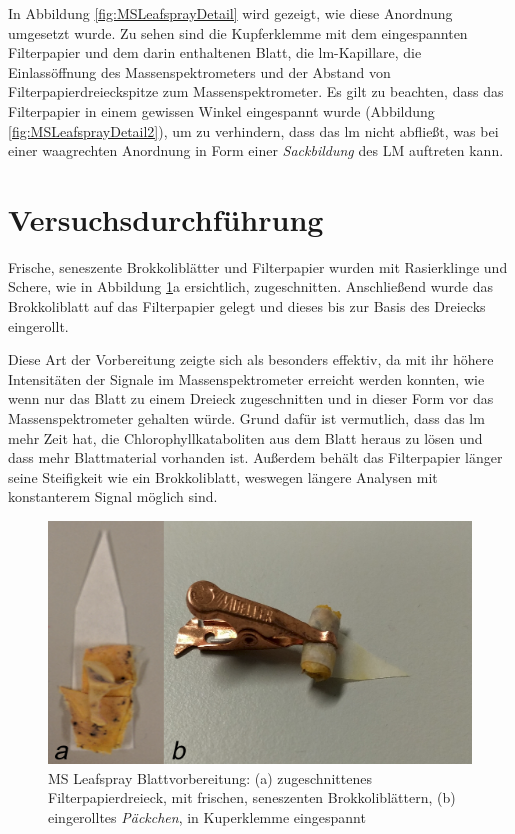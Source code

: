 In Abbildung \ref{fig:MSLeafsprayDetail} wird gezeigt, wie diese Anordnung umgesetzt wurde. Zu sehen sind die Kupferklemme mit dem eingespannten Filterpapier und dem darin enthaltenen Blatt, die \gls{lm}-Kapillare, die Einlassöffnung des Massenspektrometers und der Abstand von Filterpapierdreieckspitze zum Massenspektrometer. Es gilt zu beachten, dass das Filterpapier in einem gewissen Winkel eingespannt wurde (Abbildung \ref{fig:MSLeafsprayDetail2}), um zu verhindern, dass das \gls{lm} nicht abfließt, was bei einer waagrechten Anordnung in Form einer \textit{Sackbildung} des LM auftreten kann.

\pagebreak
\section{Versuchsdurchführung} \label{sec:Versuchsdurchfuehrung}

Frische, seneszente Brokkoliblätter und Filterpapier wurden mit Rasierklinge und Schere, wie in Abbildung \ref{fig:LeafsprayVorbereitung}a ersichtlich, zugeschnitten. Anschließend wurde das Brokkoliblatt auf das Filterpapier gelegt und dieses bis zur Basis des Dreiecks eingerollt. 

Diese Art der Vorbereitung zeigte sich als besonders effektiv, da mit ihr höhere Intensitäten der Signale im Massenspektrometer erreicht werden konnten, wie wenn nur das Blatt zu einem Dreieck zugeschnitten und in dieser Form vor das Massenspektrometer gehalten würde. Grund dafür ist vermutlich, dass das \gls{lm} mehr Zeit hat, die Chlorophyllkataboliten aus dem Blatt heraus zu lösen und dass mehr Blattmaterial vorhanden ist. Außerdem behält das Filterpapier länger seine Steifigkeit wie ein Brokkoliblatt, weswegen längere Analysen mit konstanterem Signal möglich sind.

\begin{figure}[hbtp]
  \centering
  \includegraphics[scale=0.5]{figures/Kapitel4/VWA_MSLeafspray_Blattvobereitung_zwei.png}
  \caption[MS Leafspray Blattvorbereitung, Quelle: Autor]{MS Leafspray Blattvorbereitung: (a) zugeschnittenes Filterpapierdreieck, mit frischen, seneszenten Brokkoliblättern, (b) eingerolltes \textit{Päckchen}, in Kuperklemme eingespannt}
  \label{fig:LeafsprayVorbereitung}
\end{figure}

